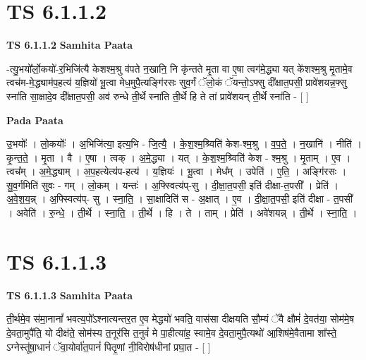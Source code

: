 \documentclass[17pt]{extarticle}
\begin{document}

\section{ TS 6.1.1.2 }

\textbf{TS 6.1.1.2 } \newline
\textbf{Samhita Paata} \newline

-त्यु॒भयो᳚र्लो॒कयो॑-र॒भिजि॑त्यै केशश्म॒श्रु व॑पते न॒खानि॒ नि कृ॑न्तते मृ॒ता वा ए॒षा त्वग॑मे॒द्ध्या यत् के॑शश्म॒श्रु मृ॒तामे॒व त्वच॑म-मे॒द्ध्याम॑प॒हत्य॑ य॒ज्ञियो॑ भू॒त्वा मेध॒मुपै॒त्यङ्गि॑रसः सुव॒र्गं ॅलो॒कं ॅयन्तो॒ऽफ्सु दी᳚क्षात॒पसी॒ प्रावे॑शयन्न॒फ्सु स्ना॑ति सा॒क्षादे॒व दी᳚क्षात॒पसी॒ अव॑ रुन्धे ती॒र्थे स्ना॑ति ती॒र्थे हि ते तां प्रावे॑शयन् ती॒र्थे स्ना॑ति - [  ] \newline

\textbf{Pada Paata} \newline

उ॒भयोः᳚ । लो॒कयोः᳚ । अ॒भिजि॑त्या॒ इत्य॒भि - जि॒त्यै॒ । के॒श॒श्म॒श्र्विति॑ केश-श्म॒श्रु । व॒प॒ते॒ । न॒खानि॑ । नीति॑ । कृ॒न्त॒ते॒ । मृ॒ता । वै । ए॒षा । त्वक् । अ॒मे॒द्ध्या । यत् । के॒श॒श्म॒श्र्विति॑ केश - श्म॒श्रु । मृ॒ताम् । ए॒व । त्वच᳚म् । अ॒मे॒द्ध्याम् । अ॒प॒हत्येत्य॑प-हत्य॑ । य॒ज्ञियः॑ । भू॒त्वा । मेध᳚म् । उपेति॑ । ए॒ति॒ । अङ्गि॑रसः । सु॒व॒र्गमिति॑ सुवः - गम् । लो॒कम् । यन्तः॑ । अ॒फ्स्वित्य॑प्-सु । दी॒क्षा॒त॒पसी॒ इति॑ दीक्षा-त॒पसी᳚ । प्रेति॑ । अ॒वे॒श॒य॒न्न् । अ॒फ्स्वित्य॑प्- सु । स्ना॒ति॒ । सा॒क्षादिति॑ स - अ॒क्षात् । ए॒व । दी॒क्षा॒त॒पसी॒ इति॑ दीक्षा - त॒पसी᳚ । अवेति॑ । रु॒न्धे॒ । ती॒र्थे । स्ना॒ति॒ । ती॒र्थे । हि । ते । ताम् । प्रेति॑ । अवे॑शयन्न् । ती॒र्थे । स्ना॒ति॒ ।  \newline





\section{ TS 6.1.1.3 }

\textbf{TS 6.1.1.3 } \newline
\textbf{Samhita Paata} \newline

ती॒र्थमे॒व स॑मा॒नानां᳚ भवत्य॒पो᳚ऽश्नात्यन्तर॒त ए॒व मेद्ध्यो॑ भवति॒ वास॑सा दीक्षयति सौ॒म्यं ॅवै क्षौमं॑ दे॒वत॑या॒ सोम॑मे॒ष दे॒वता॒मुपै॑ति॒ यो दीक्ष॑ते॒ सोम॑स्य त॒नूर॑सि त॒नुवं॑ मे पा॒हीत्या॑ह॒ स्वामे॒व दे॒वता॒मुपै॒त्यथो॑ आ॒शिष॑मे॒वैतामा शा᳚स्ते॒ ऽग्नेस्तू॑षा॒धानं॑ ॅवा॒योर्वा॑त॒पानं॑ पितृ॒णां नी॒विरोष॑धीनां प्रघा॒त - [  ] \newline
\end{document}
